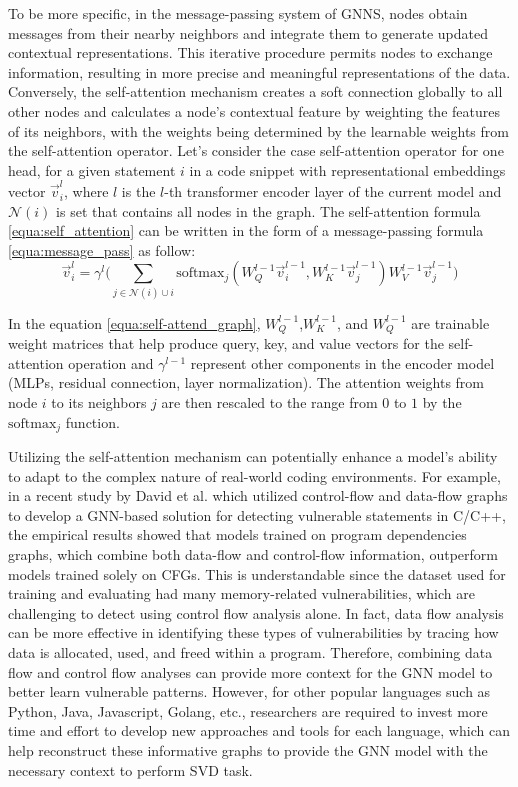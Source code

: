 \documentclass{ieeeaccess}
\begin{document}
\par To be more specific, in the message-passing system of GNNS, nodes obtain messages from their nearby neighbors and integrate them to generate updated contextual representations. This iterative procedure permits nodes to exchange information, resulting in more precise and meaningful representations of the data. Conversely, the self-attention mechanism creates a soft connection globally to all other nodes and calculates a node's contextual feature by weighting the features of its neighbors, with the  weights being determined by the learnable weights from the self-attention operator. Let's consider the case  self-attention operator for one head, for a given statement $i$ in a code snippet with representational embeddings vector $\Vec{v}^l_i$, where $l$ is the $l$-th transformer encoder layer of the current model and $\mathcal{N}(i)$ is set that contains all nodes in the graph. The self-attention formula \ref{equa:self_attention} can be written in the form of a message-passing formula \ref{equa:message_pass} as follow:
\begin{equation} \label{equa:self-attend_graph}
\Vec{v}^{l}_i = \gamma^l\bigg(\sum_{j\in \mathcal{N}(i)\cup i} \text{softmax}_j(W_Q^{l-1} \Vec{v}^{l-1}_i, W_K^{l-1} \Vec{v}^{l-1}_j) W_V^{l-1} \Vec{v}^{l-1}_j \bigg)
\end{equation}
\par In the equation \ref{equa:self-attend_graph}, $W_Q^{l-1}$,$W_K^{l-1}$, and $W_Q^{l-1}$ are trainable weight matrices that help produce query, key, and value vectors for the self-attention operation and  $\gamma^{l-1}$  represent other components in the encoder model (MLPs, residual connection, layer normalization). The attention weights from node $i$ to its neighbors $j$ are then rescaled to the range from $0$ to $1$ by the $\text{softmax}_j$  function.
\par  Utilizing the self-attention mechanism can potentially enhance a model's ability to adapt to the complex nature of real-world coding environments. For example, in a recent study by David et al. \cite{Linevd} which utilized control-flow and data-flow graphs to develop a GNN-based solution for detecting vulnerable statements in C/C++, the empirical results showed that models trained on program dependencies graphs, which combine both data-flow and control-flow information, outperform models trained solely on CFGs. This is understandable since the dataset used for training and evaluating  had many memory-related vulnerabilities, which are challenging to detect using control flow analysis alone. In fact, data flow analysis can be more effective in identifying these types of vulnerabilities by tracing how data is allocated, used, and freed within a program. Therefore, combining data flow and control flow analyses can provide more context for the GNN model to better learn vulnerable patterns. However, for other popular languages such as Python, Java, Javascript, Golang, etc.,  researchers are required to invest more time and effort to develop new approaches and tools for each language, which can help reconstruct these informative graphs to provide the GNN model with the necessary context to perform SVD task.
\end{document}
